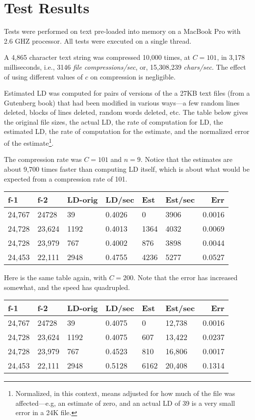 \documentclass[html]{article}    %
\begin{document}
\section{Test Results}

Tests were performed on text pre-loaded into memory on a MacBook Pro with 2.6 GHZ processor. 
All tests were executed on a single thread. 

A 4,865 character text string was compressed 10,000 times, at $C=101$, in 3,178 milliseconds, i.e., 3146 {\em file compressions/sec},
or, 15,308,239 {\em chars/sec}.  The effect of using different values of $c$ on compression is negligible.

Estimated LD was computed for pairs of versions of the a 27KB text files (from a Gutenberg book) that had been modified in 
various ways---a few random lines deleted, blocks of lines deleted, random words deleted, etc. 
The table below gives the original file sizes, the actual LD, the rate  of computation for LD,  the estimated LD, 
the rate of computation for the estimate, and the normalized error of the estimate\footnote{ 
	Normalized, in this context, means adjusted for how much of the file was affected---e.g, an estimate of zero, 
	and an actual LD of 39 is a very small error in a 24K file.
}.
\vspace {10 mm}

The compression rate was $C=101$ and $n=9$. Notice that the estimates are about 9,700 times faster than computing LD itself,
which is about what would be expected from a compression rate of 101.

\vspace {10 mm}
\begin {tabular} {|l|l|l|l|l|l|r|} \hline \hline
 f-1  		& f-2 		& LD-orig	&LD/sec		& Est 		& Est/sec	 & Err  	\\ \hline
 \hline
 24,767 	& 24728  	& 39  		& 0.4026	& 0  	 	& 3906 	 	& 0.0016 	\\ \hline
 24,728 	& 23,624  	& 1192  	& 0.4013	& 1364   	& 4032 	 	& 0.0069 	\\ \hline
 24,728 	& 23,979  	& 767  		& 0.4002	& 876   	& 3898 	 	& 0.0044 	\\ \hline
 24,453 	& 22,111  	& 2948  	& 0.4755	& 4236   	& 5277 	 	& 0.0527 	\\ \hline
\end {tabular}
\vspace {10 mm}


Here is the same table again, with $C=200$.
Note that the error has increased somewhat,  and the speed has quadrupled.

\vspace {10 mm}
\begin {tabular} {|l|l|l|l|l|l|r|} \hline \hline
 f-1  		& f-2 		& LD-orig	&LD/sec		& Est 		& Est/sec	 & Err  	\\ \hline
 \hline
 24,767 	& 24728  	& 39  		& 0.4075	& 0  	 	& 12,738 	 	& 0.0016 	\\ \hline
 24,728 	& 23,624  	& 1192  	& 0.4075	& 607   	& 13,422 	 	& 0.0237 	\\ \hline
 24,728 	& 23,979  	& 767  		& 0.4523	& 810   	& 16,806 	 	& 0.0017 	\\ \hline
 24,453 	& 22,111  	& 2948  	& 0.5128	& 6162   	& 20,408 	 	& 0.1314 	\\ \hline
\end {tabular}
\vspace {10 mm}
\end{document}
